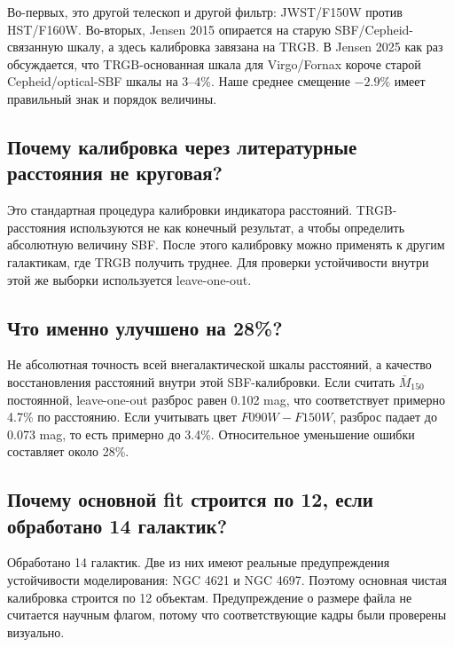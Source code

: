\documentclass[12pt]{article}
\begin{document}
Во-первых, это другой телескоп и другой фильтр: JWST/F150W против HST/F160W. Во-вторых, Jensen 2015 опирается на старую SBF/Cepheid-связанную шкалу, а здесь калибровка завязана на TRGB. В Jensen 2025 как раз обсуждается, что TRGB-основанная шкала для Virgo/Fornax короче старой Cepheid/optical-SBF шкалы на 3--4\%. Наше среднее смещение $-2.9\%$ имеет правильный знак и порядок величины.

\subsection*{Почему калибровка через литературные расстояния не круговая?}

Это стандартная процедура калибровки индикатора расстояний. TRGB-расстояния используются не как конечный результат, а чтобы определить абсолютную величину SBF. После этого калибровку можно применять к другим галактикам, где TRGB получить труднее. Для проверки устойчивости внутри этой же выборки используется leave-one-out.

\subsection*{Что именно улучшено на 28\%?}

Не абсолютная точность всей внегалактической шкалы расстояний, а качество восстановления расстояний внутри этой SBF-калибровки. Если считать $\bar{M}_{150}$ постоянной, leave-one-out разброс равен 0.102 mag, что соответствует примерно 4.7\% по расстоянию. Если учитывать цвет $F090W-F150W$, разброс падает до 0.073 mag, то есть примерно до 3.4\%. Относительное уменьшение ошибки составляет около 28\%.

\subsection*{Почему основной fit строится по 12, если обработано 14 галактик?}

Обработано 14 галактик. Две из них имеют реальные предупреждения устойчивости моделирования: NGC 4621 и NGC 4697. Поэтому основная чистая калибровка строится по 12 объектам. Предупреждение о размере файла не считается научным флагом, потому что соответствующие кадры были проверены визуально.
\end{document}
